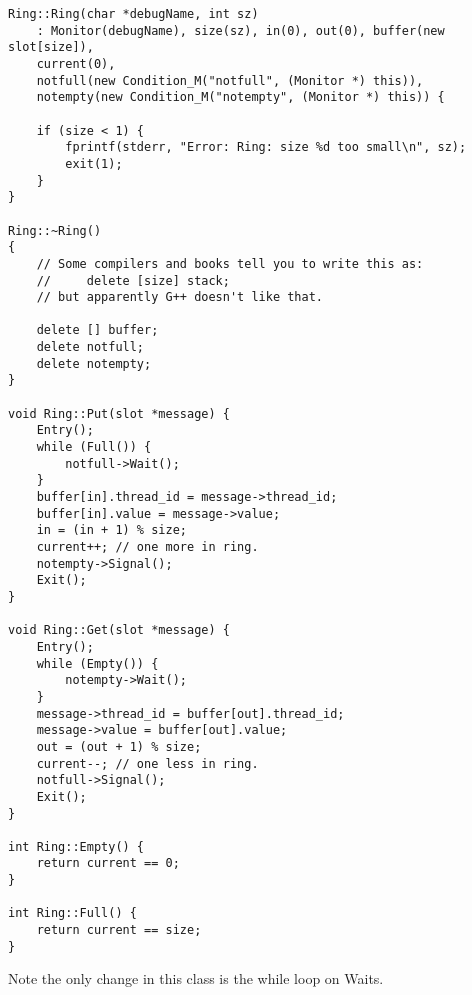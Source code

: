 \documentclass[11pt]{article}
\begin{document}
\begin{question}
\begin{verbatim}
Ring::Ring(char *debugName, int sz)
    : Monitor(debugName), size(sz), in(0), out(0), buffer(new slot[size]),
    current(0),
    notfull(new Condition_M("notfull", (Monitor *) this)),
    notempty(new Condition_M("notempty", (Monitor *) this)) {

    if (size < 1) {
        fprintf(stderr, "Error: Ring: size %d too small\n", sz);
        exit(1);
    }
}

Ring::~Ring()
{
    // Some compilers and books tell you to write this as:
    //     delete [size] stack;
    // but apparently G++ doesn't like that.

    delete [] buffer;
    delete notfull;
    delete notempty;
}

void Ring::Put(slot *message) {
    Entry();
    while (Full()) {
        notfull->Wait();
    }
    buffer[in].thread_id = message->thread_id;
    buffer[in].value = message->value;
    in = (in + 1) % size;
    current++; // one more in ring.
    notempty->Signal();
    Exit();
}

void Ring::Get(slot *message) {
    Entry();
    while (Empty()) {
        notempty->Wait();
    }
    message->thread_id = buffer[out].thread_id;
    message->value = buffer[out].value;
    out = (out + 1) % size;
    current--; // one less in ring.
    notfull->Signal();
    Exit();
}

int Ring::Empty() {
    return current == 0;
}

int Ring::Full() {
    return current == size;
}
    \end{verbatim}

    Note the only change in this class is the while loop on Waits.

\end{question}
\end{document}

